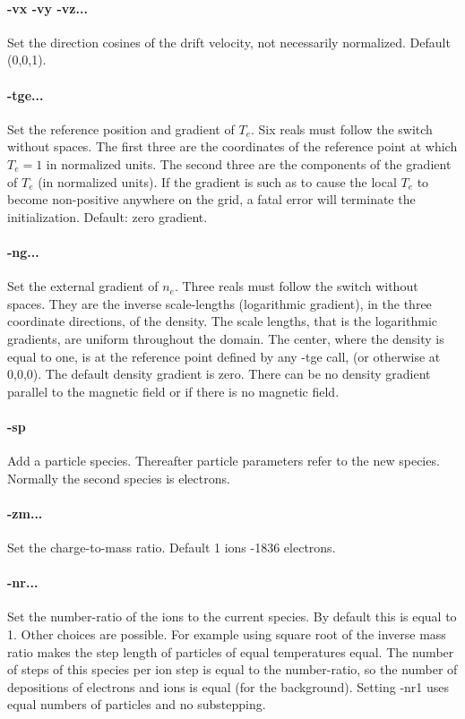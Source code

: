 \documentclass[12pt]{article}
\begin{document}
\paragraph{-vx -vy -vz...} Set the direction cosines of the drift
velocity, not necessarily normalized. Default (0,0,1).

\paragraph{-tge...} Set the reference position and gradient of
$T_e$. Six reals must follow the switch without spaces. The first
three are the coordinates of the reference point at which $T_e=1$ in
normalized units. The second three are the components of the gradient
of $T_e$ (in normalized units). If the gradient is such as to cause
the local $T_e$ to become non-positive anywhere on the grid, a fatal
error will terminate the initialization. Default: zero gradient. 

\paragraph{-ng...} Set the external gradient of $n_e$. Three reals
must follow the switch without spaces. They are the inverse
scale-lengths (logarithmic gradient), in the three coordinate
directions, of the density. The scale lengths, that is the
logarithmic gradients, are uniform throughout the domain. The center,
where the density is equal to one, is at the reference point defined
by any -tge call, (or otherwise at 0,0,0). The default density gradient is zero. There can be
no density gradient parallel to the magnetic field or if there is no
magnetic field.

\paragraph{-sp} Add a particle species. Thereafter particle parameters
refer to the new species. Normally the second species is electrons.

\paragraph{-zm...} Set the charge-to-mass ratio. Default 1 ions -1836
electrons.

\paragraph{-nr...} Set the number-ratio of the ions to the current
species. By default this is equal to 1. Other choices are
possible. For example using square root of the inverse mass ratio
makes the step length of particles of equal temperatures equal. The
number of steps of this species per ion step is equal to the
number-ratio, so the number of depositions of electrons and ions is
equal (for the background).  Setting -nr1 uses equal numbers of
particles and no substepping.
\end{document}
